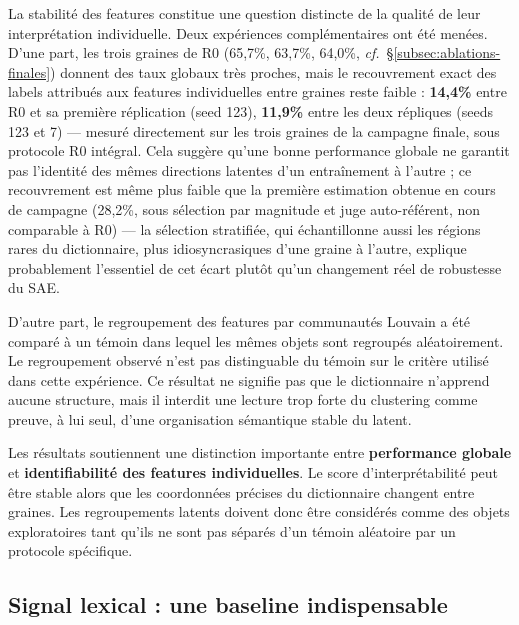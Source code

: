 \documentclass[11pt]{article}
\begin{document}
La stabilité des features constitue une question distincte de la qualité de leur
interprétation individuelle. Deux expériences complémentaires ont été menées. D'une
part, les trois graines de R0 (65,7\%, 63,7\%, 64,0\%, \emph{cf.}~\S\ref{subsec:ablations-finales})
donnent des taux globaux très proches, mais le recouvrement exact des labels attribués
aux features individuelles entre graines reste faible : \textbf{14,4\%} entre R0 et sa
première réplication (seed 123), \textbf{11,9\%} entre les deux répliques (seeds 123 et
7) --- mesuré directement sur les trois graines de la campagne finale, sous protocole
R0 intégral. Cela suggère qu'une bonne performance globale ne garantit pas
l'identité des mêmes directions latentes d'un entraînement à l'autre ; ce recouvrement
est même plus faible que la première estimation obtenue en cours de campagne (28,2\%,
sous sélection par magnitude et juge auto-référent, non comparable à R0) --- la
sélection stratifiée, qui échantillonne aussi les régions rares du dictionnaire, plus
idiosyncrasiques d'une graine à l'autre, explique probablement l'essentiel de cet
écart plutôt qu'un changement réel de robustesse du SAE.

D'autre part, le regroupement des features par communautés Louvain a été comparé à un
témoin dans lequel les mêmes objets sont regroupés aléatoirement. Le regroupement
observé n'est pas distinguable du témoin sur le critère utilisé dans cette expérience.
Ce résultat ne signifie pas que le dictionnaire n'apprend aucune structure, mais il
interdit une lecture trop forte du clustering comme preuve, à lui seul, d'une
organisation sémantique stable du latent.

\begin{resultbox}
Les résultats soutiennent une distinction importante entre \textbf{performance globale}
et \textbf{identifiabilité des features individuelles}. Le score d'interprétabilité peut
être stable alors que les coordonnées précises du dictionnaire changent entre graines.
Les regroupements latents doivent donc être considérés comme des objets exploratoires
tant qu'ils ne sont pas séparés d'un témoin aléatoire par un protocole spécifique.
\end{resultbox}

\subsection{Signal lexical : une baseline indispensable}
\label{subsec:lexical-leakage}
\end{document}
